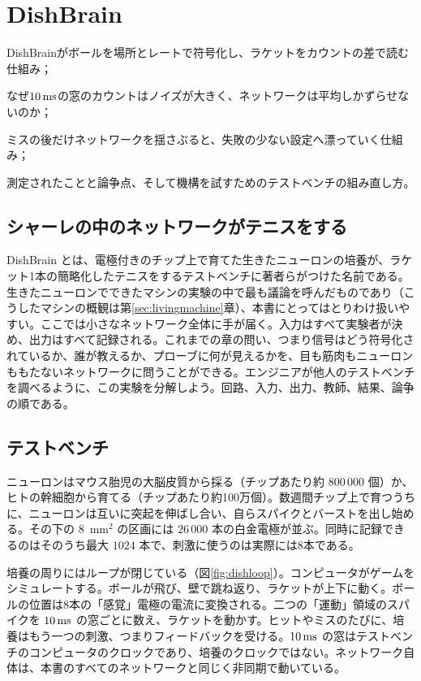\chapter{DishBrain}
\label{sec:dishbrain}
\begin{chaptergoals}
\item DishBrainがボールを場所とレートで符号化し、ラケットをカウントの差で読む仕組み；
\item なぜ$10\,\text{ms}$の窓のカウントはノイズが大きく、ネットワークは平均しかずらせないのか；
\item ミスの後だけネットワークを揺さぶると、失敗の少ない設定へ漂っていく仕組み；
\item 測定されたことと論争点、そして機構を試すためのテストベンチの組み直し方。
\end{chaptergoals}

\section{シャーレの中のネットワークがテニスをする}

DishBrain とは、電極付きのチップ上で育てた生きたニューロンの培養が、ラケット1本の簡略化したテニスをするテストベンチに著者らがつけた名前である\cite{Kagan2022}。生きたニューロンでできたマシンの実験の中で最も議論を呼んだものであり（こうしたマシンの概観は第\ref{sec:livingmachine}章）、本書にとってはとりわけ扱いやすい。ここでは小さなネットワーク全体に手が届く。入力はすべて実験者が決め、出力はすべて記録される。これまでの章の問い、つまり信号はどう符号化されているか、誰が教えるか、プローブに何が見えるかを、目も筋肉もニューロンももたないネットワークに問うことができる。エンジニアが他人のテストベンチを調べるように、この実験を分解しよう。回路、入力、出力、教師、結果、論争の順である。

\section{テストベンチ}

ニューロンはマウス胎児の大脳皮質から採る（チップあたり約 $800\,000$ 個）か、ヒトの幹細胞から育てる（チップあたり約100万個）。数週間チップ上で育つうちに、ニューロンは互いに突起を伸ばし合い、自らスパイクとバーストを出し始める。その下の $8$~mm$^2$ の区画には $26\,000$ 本の白金電極が並ぶ。同時に記録できるのはそのうち最大 $1024$ 本で、刺激に使うのは実際には8本である。

培養の周りにはループが閉じている（図\ref{fig:dishloop}）。コンピュータがゲームをシミュレートする。ボールが飛び、壁で跳ね返り、ラケットが上下に動く。ボールの位置は8本の「感覚」電極の電流に変換される。二つの「運動」領域のスパイクを $10\,\text{ms}$ の窓ごとに数え、ラケットを動かす。ヒットやミスのたびに、培養はもう一つの刺激、つまりフィードバックを受ける。$10\,\text{ms}$ の窓はテストベンチのコンピュータのクロックであり、培養のクロックではない。ネットワーク自体は、本書のすべてのネットワークと同じく非同期で動いている。

